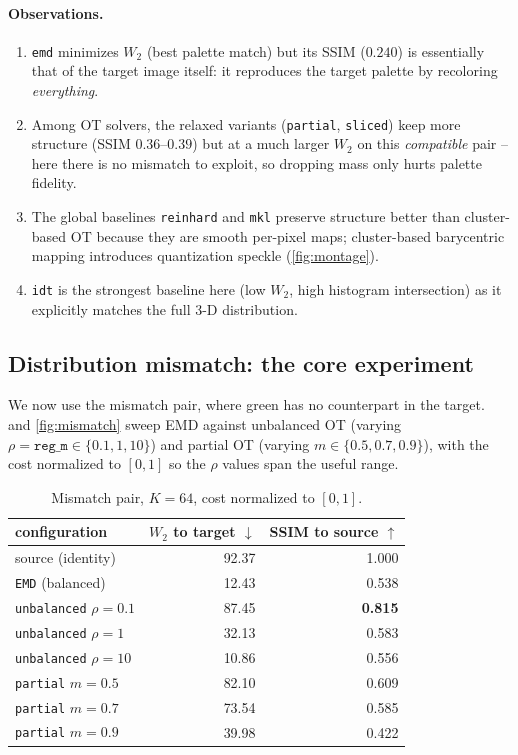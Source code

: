 \documentclass[11pt,a4paper]{article}
\newcommand{\code}[1]{\texttt{#1}}
\begin{document}
\paragraph{Observations.}
\begin{enumerate}
  \item \code{emd} minimizes $W_2$ (best palette match) but its SSIM ($0.240$) is
        essentially that of the target image itself: it reproduces the target
        palette by recoloring \emph{everything}.
  \item Among OT solvers, the relaxed variants (\code{partial}, \code{sliced})
        keep more structure (SSIM $0.36$--$0.39$) but at a much larger $W_2$ on
        this \emph{compatible} pair -- here there is no mismatch to exploit, so
        dropping mass only hurts palette fidelity.
  \item The global baselines \code{reinhard} and \code{mkl} preserve structure
        better than cluster-based OT because they are smooth per-pixel maps;
        cluster-based barycentric mapping introduces quantization speckle
        (\cref{fig:montage}).
  \item \code{idt} is the strongest baseline here (low $W_2$, high histogram
        intersection) as it explicitly matches the full 3-D distribution.
\end{enumerate}

\subsection{Distribution mismatch: the core experiment}
\label{sec:res-mismatch}

We now use the mismatch pair, where green has no counterpart in the target.
 and \cref{fig:mismatch} sweep EMD against unbalanced OT
(varying $\rho = \code{reg\_m} \in \{0.1, 1, 10\}$) and partial OT
(varying $m \in \{0.5, 0.7, 0.9\}$), with the cost normalized to $[0,1]$ so the
$\rho$ values span the useful range.

\begin{table}[t]
\centering
\caption{Mismatch pair, $K = 64$, cost normalized to $[0,1]$.}
\label{tab:mismatch}
\begin{tabular}{@{}lrr@{}}
\toprule
configuration & $W_2$ to target $\downarrow$ & SSIM to source $\uparrow$ \\
\midrule
source (identity)            & 92.37 & 1.000 \\
\code{EMD} (balanced)        & 12.43 & 0.538 \\
\code{unbalanced} $\rho=0.1$ & 87.45 & \textbf{0.815} \\
\code{unbalanced} $\rho=1$   & 32.13 & 0.583 \\
\code{unbalanced} $\rho=10$  & 10.86 & 0.556 \\
\code{partial} $m=0.5$       & 82.10 & 0.609 \\
\code{partial} $m=0.7$       & 73.54 & 0.585 \\
\code{partial} $m=0.9$       & 39.98 & 0.422 \\
\bottomrule
\end{tabular}
\end{table}
\end{document}
